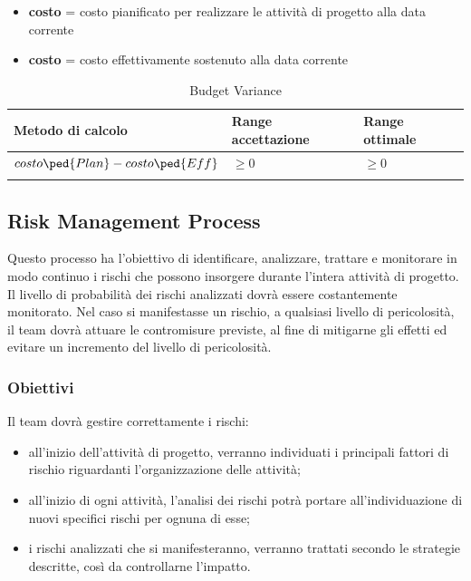 		\begin{itemize}
			\item \textbf{costo} = costo pianificato per realizzare le attività di progetto alla data corrente
			\item \textbf{costo} = costo effettivamente sostenuto alla data corrente
		\end{itemize}
		\vspace{1.3cm}
		\begin{longtable}{>{\centering\arraybackslash}p{5cm}|>{\centering\arraybackslash}p{5cm} | >{\centering\arraybackslash}p{5cm}}
				\hline
				\rowcolor{Gray}
				\textbf{Metodo di calcolo} & \textbf{Range accettazione} & \textbf{Range ottimale} \\
				\hline
				\begin{math}
				{costo\ped{Plan} - costo\ped{Eff}}
				\end{math} & \begin{math}\geq{0} \end{math}  & \begin{math}\geq{0} \end{math}
			\\
			\caption{Budget Variance}
		\end{longtable}
		
	\subsection{Risk Management Process}
	Questo processo ha l'obiettivo di identificare, analizzare, trattare e monitorare in modo continuo i rischi che possono insorgere durante l’intera attività di progetto.
	Il livello di probabilità dei rischi analizzati dovrà essere costantemente monitorato. Nel caso si manifestasse un rischio, a qualsiasi livello di pericolosità, il team dovrà attuare le contromisure previste, al fine di mitigarne gli effetti ed evitare un incremento del livello di pericolosità.
		\subsubsection{Obiettivi}
		Il team dovrà gestire correttamente i rischi:
		\begin{itemize}
			\item all’inizio dell’attività di progetto, verranno individuati i principali fattori di rischio riguardanti l’organizzazione delle attività;
			\item all’inizio di ogni attività, l’analisi dei rischi potrà portare all’individuazione di nuovi specifici rischi per ognuna di esse;
			\item i rischi analizzati che si manifesteranno, verranno trattati secondo le strategie descritte, così da controllarne l'impatto.
		\end{itemize}
